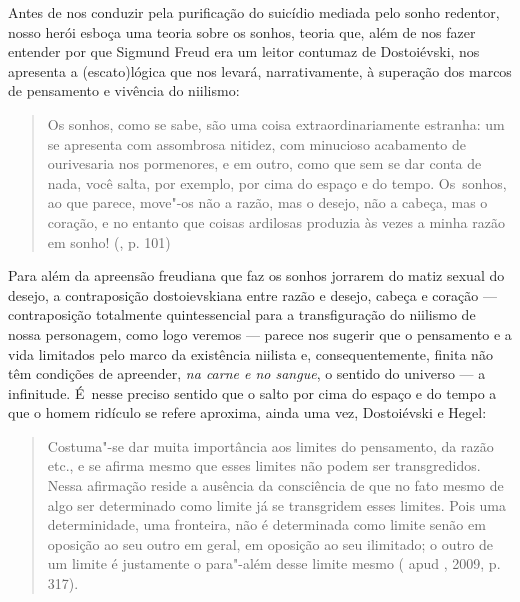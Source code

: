 Antes de nos conduzir pela purificação do suicídio mediada pelo sonho
redentor, nosso herói esboça uma teoria sobre os sonhos, teoria que,
além de nos fazer entender por que Sigmund Freud era um leitor contumaz
de Dostoiévski, nos apresenta a (escato)lógica que nos levará,
narrativamente, à superação dos marcos de pensamento e vivência do
niilismo:

\begin{quote}
Os sonhos, como se sabe, são uma coisa extraordinariamente estranha: um
se apresenta com assombrosa nitidez, com minucioso acabamento de
ourivesaria nos pormenores, e em outro, como que sem se dar conta de
nada, você salta, por exemplo, por cima do espaço e do tempo. Os~sonhos,
ao que parece, move"-os não a razão, mas o desejo, não a cabeça, mas o
coração, e no entanto que coisas ardilosas produzia às vezes a minha
razão em sonho! (, p. 101)
\end{quote}

Para além da apreensão freudiana que faz os sonhos jorrarem do matiz
sexual do desejo, a contraposição dostoievskiana entre razão e desejo,
cabeça e coração --- contraposição totalmente quintessencial para a
transfiguração do niilismo de nossa personagem, como logo veremos ---
parece nos sugerir que o pensamento e a vida limitados pelo marco da
existência niilista e, consequentemente, finita não têm condições de
apreender, \emph{na carne e no sangue}, o sentido do universo --- a
infinitude. É~nesse preciso sentido que o salto por cima do espaço e do
tempo a que o homem ridículo se refere aproxima, ainda uma vez,
Dostoiévski e Hegel:

\begin{quote}
Costuma"-se dar muita importância aos limites do pensamento, da razão
etc., e se afirma mesmo que esses limites não podem ser transgredidos.
Nessa afirmação reside a ausência da consciência de que no fato mesmo de
algo ser determinado como limite já se transgridem esses limites. Pois
uma determinidade, uma fronteira, não é determinada como limite senão em
oposição ao seu outro em geral, em oposição ao seu ilimitado; o outro de
um limite é justamente o para"-além desse limite mesmo ( apud
, 2009, p. 317).
\end{quote}

